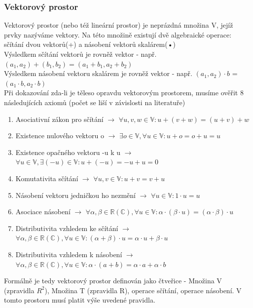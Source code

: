 \documentclass[10pt,a4paper]{article}
\begin{document}
\subsubsection{Vektorový prostor}Vektorový prostor (nebo též lineární prostor) je neprázdná množina V, jejíž prvky nazýváme vektory. Na této množině existují dvě algebraické operace: sčítání dvou vektorů(+) a násobení vektorů skalárem(•)\\
Výsledkem sčítání vektorů je rovněž vektor - např. $(a_1,a_2) + (b_1,b_2) = (a_1+b_1,a_2+b_2)$\\
Výsledkem násobení vektoru skalárem je rovněž vektor - např. $(a_1,a_2) \cdot b$ = $(a_1\cdot b,a_2\cdot b)$\\
Při dokazování zda-li je těleso opravdu vektorovým prostorem, musíme ověřit 8 následujících axiomů (počet se liší v závislosti na literatuře)\\
\begin{enumerate}
\item Asociativní zákon pro sčítání $\rightarrow$ $\forall u,v,w \in \mathbb{V} : u + (v + w) = (u + v) + w$
\item Existence nulového vektoru o $\rightarrow$ $\exists o \in \mathbb{V}, \forall u \in \mathbb{V} : u+o = o+u = u$
\item Existence opačného vektoru -u k u $\rightarrow$ $\forall u \in \mathbb{V}, \exists (-u) \in \mathbb{V} : u+(-u) = -u+u=0$
\item Komutativita sčítání $\rightarrow$ $\forall u,v \in \mathbb{V} : u+v = v+u$
\item Násobení vektoru jedničkou ho nezmění $\rightarrow$ $\forall u \in \mathbb{V}:1\cdot u = u$
\item Asociace násobení $\rightarrow$ $\forall \alpha, \beta \in \mathbb{R(C)},\forall u \in \mathbb{V}: \alpha \cdot (\beta \cdot u) = (\alpha \cdot \beta )\cdot u $
\item Distributivita vzhledem ke sčítání $\rightarrow$ $\forall \alpha, \beta \in \mathbb{R(C)},\forall u \in \mathbb{V}: (\alpha + \beta) \cdot u = \alpha \cdot u + \beta \cdot u$
\item Distributivita vzhledem k násobení $\rightarrow$ $\forall \alpha, \beta \in \mathbb{R(C)},\forall u \in \mathbb{V}:\alpha \cdot (a + b) = \alpha \cdot a + \alpha \cdot b$
\end{enumerate}
Formálně je tedy vektorový prostor definován jako čtveřice - Množina V (zpravidla $R^2$), Množina T (zpravidla R), operace sčítání, operace násobení. V tomto prostoru musí platit výše uvedené pravidla.\\
\end{document}
